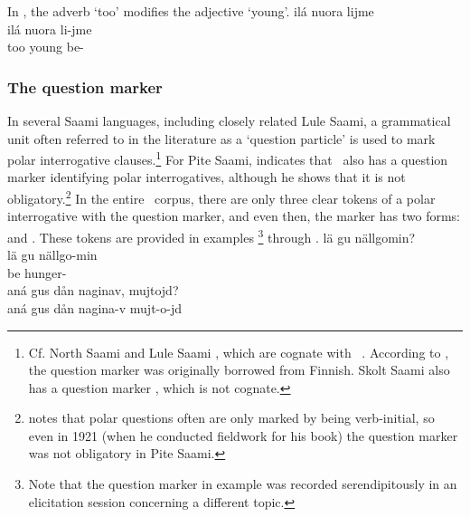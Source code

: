In , the adverb  ‘too’ modifies the adjective  ‘young’. 
\ea\label{ADVsEx2}%
\glll	ilá nuora lijme\\
	ilá nuora li-jme\\
	too young\BS{} be-\\\nopagebreak
{}	
\z


\subsubsection{The question marker \TILDE{}}\label{QpartWordform}
In several Saami languages, including closely related Lule Saami, a grammatical unit often referred to in the literature as a ‘question particle’ is used to mark polar interrogative clauses.\footnote{Cf. North Saami  \citep[cf.][90]{Svonni2009} and Lule Saami  \citep[cf.][94-94]{Spiik1989}, which are cognate with \PS\ \TILDE{}. According to \citet[245]{Sammallahti1998}, the question marker was originally borrowed from Finnish. Skolt Saami also has a question marker  \citep[cf.][319-320]{Feist2010}, which is not cognate.} 
For Pite Saami, \citet[20-21]{Lagercrantz1926} %
indicates that \PS\ also has a question marker  identifying polar interrogatives, although he shows that it is not obligatory.\footnote{\citet[21]{Lagercrantz1926} notes that polar questions often are only marked by being verb-initial, so even in 1921 (when he conducted fieldwork for his book) the question marker was not obligatory in Pite Saami.} 
In the entire \PSDP\ corpus, there are only three clear tokens of a polar interrogative with the question marker, and even then, the marker has two forms:  and . These tokens are provided in examples \footnote{Note that the question marker in example  was recorded serendipitously in an elicitation session concerning a different topic.} 
through . 
\ea\label{Qpart1}
\glll	lä gu nällgomin?\\
	lä gu nällgo-min\\
	be\BS{}  hunger-\\\nopagebreak
{}  %
\z
\ea\label{Qpart2}
\glll	aná gus dån naginav, mujtojd?\\
	aná gus dån nagina-v mujt-o-jd\\
